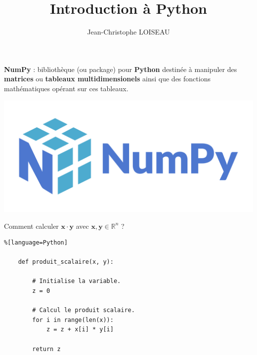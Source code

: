 \documentclass[aspectratio=169]{beamer}
\title{Introduction à Python}
\author{Jean-Christophe LOISEAU}
\institute{Arts \& Métiers Institute of Technology, 2021-2022}
\date{}
\begin{document}
\frame{\titlepage}





\begin{frame}
  \begin{minipage}{.64\textwidth}
    \textbf{\alert{NumPy}} : bibliothèque (ou package) pour \textbf{Python} destinée à manipuler des \textbf{matrices} ou \textbf{tableaux multidimensionels} ainsi que des fonctions mathématiques opérant sur ces tableaux.
  \end{minipage}%
  \hfill
  \begin{minipage}{.32\textwidth}
    \centering
    \includegraphics[width=\textwidth]{numpy_logo}
  \end{minipage}

  \vspace{-1cm}
\end{frame}






\begin{frame}
  \vfill
  \centering
  \centering

  Comment calculer $\bm{x} \cdot \bm{y}$ avec $\bm{x}, \bm{y} \in \mathbb{R}^n$ ?

  \vfill
\end{frame}

\frame{
  \vfill
  \[
  \bm{x} \cdot \bm{y} = \sum_{i=1}^n x_i y_i
  \]
  \vfill
}


\begin{frame}[fragile]{}{}
  \vfill
  \begin{lstlisting}%[language=Python]

    def produit_scalaire(x, y):

        # Initialise la variable.
        z = 0

        # Calcul le produit scalaire.
        for i in range(len(x)):
            z = z + x[i] * y[i]

        return z

  \end{lstlisting}
  \vfill
\end{frame}
\end{document}
